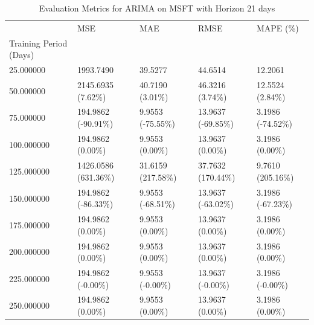 \begin{table}
\caption{Evaluation Metrics for ARIMA on MSFT with Horizon 21 days}
\label{tab:arima_MSFT_h21_metrics}
\begin{tabular}{lllll}
\toprule
 & MSE & MAE & RMSE & MAPE (\%) \\
Training Period (Days) &  &  &  &  \\
\midrule
25.000000 & 1993.7490 & 39.5277 & 44.6514 & 12.2061 \\
50.000000 & 2145.6935 (7.62\%) & 40.7190 (3.01\%) & 46.3216 (3.74\%) & 12.5524 (2.84\%) \\
75.000000 & 194.9862 (-90.91\%) & 9.9553 (-75.55\%) & 13.9637 (-69.85\%) & 3.1986 (-74.52\%) \\
100.000000 & 194.9862 (0.00\%) & 9.9553 (0.00\%) & 13.9637 (0.00\%) & 3.1986 (0.00\%) \\
125.000000 & 1426.0586 (631.36\%) & 31.6159 (217.58\%) & 37.7632 (170.44\%) & 9.7610 (205.16\%) \\
150.000000 & 194.9862 (-86.33\%) & 9.9553 (-68.51\%) & 13.9637 (-63.02\%) & 3.1986 (-67.23\%) \\
175.000000 & 194.9862 (0.00\%) & 9.9553 (0.00\%) & 13.9637 (0.00\%) & 3.1986 (0.00\%) \\
200.000000 & 194.9862 (0.00\%) & 9.9553 (0.00\%) & 13.9637 (0.00\%) & 3.1986 (0.00\%) \\
225.000000 & 194.9862 (-0.00\%) & 9.9553 (-0.00\%) & 13.9637 (-0.00\%) & 3.1986 (-0.00\%) \\
250.000000 & 194.9862 (0.00\%) & 9.9553 (0.00\%) & 13.9637 (0.00\%) & 3.1986 (0.00\%) \\
\bottomrule
\end{tabular}
\end{table}
